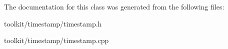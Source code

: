 The documentation for this class was generated from the following files:\begin{DoxyCompactItemize}
\item 
toolkit/timestamp/timestamp.h\item 
toolkit/timestamp/timestamp.cpp\end{DoxyCompactItemize}
